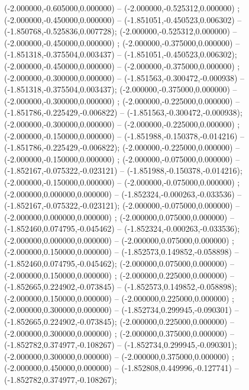  (-2.000000,-0.605000,0.000000) -- (-2.000000,-0.525312,0.000000) ;
 (-2.000000,-0.450000,0.000000) -- (-1.851051,-0.450523,0.006302) -- (-1.850768,-0.525836,0.007728);
 (-2.000000,-0.525312,0.000000) -- (-2.000000,-0.450000,0.000000) ;
 (-2.000000,-0.375000,0.000000) -- (-1.851318,-0.375504,0.003437) -- (-1.851051,-0.450523,0.006302);
 (-2.000000,-0.450000,0.000000) -- (-2.000000,-0.375000,0.000000) ;
 (-2.000000,-0.300000,0.000000) -- (-1.851563,-0.300472,-0.000938) -- (-1.851318,-0.375504,0.003437);
 (-2.000000,-0.375000,0.000000) -- (-2.000000,-0.300000,0.000000) ;
 (-2.000000,-0.225000,0.000000) -- (-1.851786,-0.225429,-0.006822) -- (-1.851563,-0.300472,-0.000938);
 (-2.000000,-0.300000,0.000000) -- (-2.000000,-0.225000,0.000000) ;
 (-2.000000,-0.150000,0.000000) -- (-1.851988,-0.150378,-0.014216) -- (-1.851786,-0.225429,-0.006822);
 (-2.000000,-0.225000,0.000000) -- (-2.000000,-0.150000,0.000000) ;
 (-2.000000,-0.075000,0.000000) -- (-1.852167,-0.075322,-0.023121) -- (-1.851988,-0.150378,-0.014216);
 (-2.000000,-0.150000,0.000000) -- (-2.000000,-0.075000,0.000000) ;
 (-2.000000,0.000000,0.000000) -- (-1.852324,-0.000263,-0.033536) -- (-1.852167,-0.075322,-0.023121);
 (-2.000000,-0.075000,0.000000) -- (-2.000000,0.000000,0.000000) ;
 (-2.000000,0.075000,0.000000) -- (-1.852460,0.074795,-0.045462) -- (-1.852324,-0.000263,-0.033536);
 (-2.000000,0.000000,0.000000) -- (-2.000000,0.075000,0.000000) ;
 (-2.000000,0.150000,0.000000) -- (-1.852573,0.149852,-0.058898) -- (-1.852460,0.074795,-0.045462);
 (-2.000000,0.075000,0.000000) -- (-2.000000,0.150000,0.000000) ;
 (-2.000000,0.225000,0.000000) -- (-1.852665,0.224902,-0.073845) -- (-1.852573,0.149852,-0.058898);
 (-2.000000,0.150000,0.000000) -- (-2.000000,0.225000,0.000000) ;
 (-2.000000,0.300000,0.000000) -- (-1.852734,0.299945,-0.090301) -- (-1.852665,0.224902,-0.073845);
 (-2.000000,0.225000,0.000000) -- (-2.000000,0.300000,0.000000) ;
 (-2.000000,0.375000,0.000000) -- (-1.852782,0.374977,-0.108267) -- (-1.852734,0.299945,-0.090301);
 (-2.000000,0.300000,0.000000) -- (-2.000000,0.375000,0.000000) ;
 (-2.000000,0.450000,0.000000) -- (-1.852808,0.449996,-0.127741) -- (-1.852782,0.374977,-0.108267);
